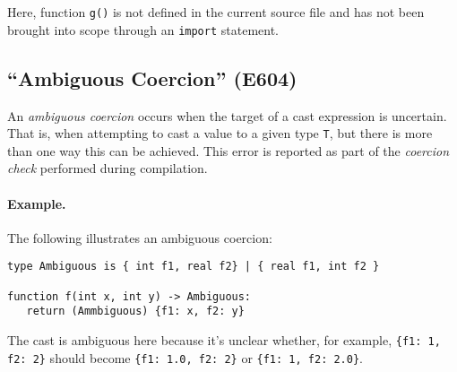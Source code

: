 Here, function \lstinline{g()} is not defined in the current source file and has not been brought into scope through an \lstinline{import} statement.

\subsection{``Ambiguous Coercion'' (E604)}

An {\em ambiguous coercion} occurs when the target of a cast expression is uncertain.  That is, when attempting to cast a value to a given type \lstinline{T}, but there is more than one way this can be achieved.  This error is reported as part of the {\em coercion check} performed during compilation.

\paragraph{Example.}  The following illustrates an ambiguous coercion:

\begin{lstlisting}
type Ambiguous is { int f1, real f2} | { real f1, int f2 }

function f(int x, int y) -> Ambiguous:
   return (Ammbiguous) {f1: x, f2: y}
\end{lstlisting}

The cast is ambiguous here because it's unclear whether, for example, \lstinline|{f1: 1, f2: 2}| should become \lstinline|{f1: 1.0, f2: 2}| or \lstinline|{f1: 1, f2: 2.0}|.

